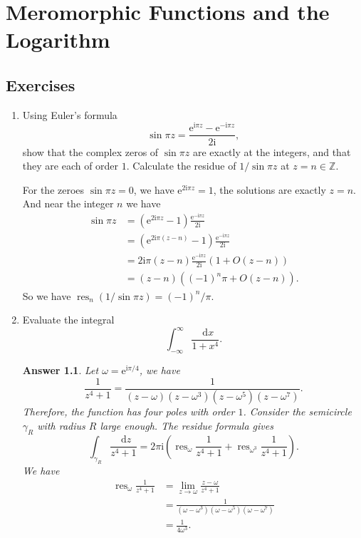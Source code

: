 \documentclass[11pt]{report}
\theoremstyle{mythm}
\let\oldendproof\endproof
\renewenvironment{proof}[1][\proofname]{%
  \oldproof[\normalfont \bfseries #1]%
}{\oldendproof}
\renewcommand*{\proofname}{Proof}
\theoremstyle{myans}
\newtheorem*{answer}{Answer}
\newcommand{\mi}{\mathrm{i}}
\newcommand{\me}{\mathrm{e}}
\newcommand{\dd}{\mathop{}\!\mathrm{d}}
\DeclareMathOperator{\res}{res}
\begin{document}
\setcounter{chapter}{2}
\chapter{Meromorphic Functions and the Logarithm}

\section{Exercises}

\begin{enumerate}
  \item Using Euler's formula
  \[ \sin \pi z = \frac{\me^{\mi \pi z} - \me^{-\mi \pi z}}{2\mi}, \]
  show that the complex zeros of $\sin\pi z$ are exactly at the integers, and that they are each of order $1$.
  Calculate the residue of $1/ \sin \pi z$ at $z = n \in \mathbb Z$.
  \begin{proof}
    For the zeroes $\sin \pi z = 0$, we have $\me^{2\mi \pi z} = 1$, the solutions are exactly
    $z=n$. And near the integer $n$ we have
    \begin{align*}
      \sin \pi z &= (\me^{2\mi \pi z} - 1)\frac{\me^{-\mi \pi z}}{2\mi}\\
      &= (\me^{2\mi \pi (z-n)} - 1)\frac{\me^{-\mi \pi z}}{2\mi}\\
      &= 2\mi \pi (z-n)\frac{\me^{-\mi \pi z}}{2\mi}(1 + O(z-n))\\
      &= (z-n)\left((-1)^n\pi  + O(z-n)\right).
    \end{align*}
    So we have $\res_n (1/\sin \pi z) = (-1)^n / \pi$.
  \end{proof}
  \item Evaluate the integral
  \[ \int_{-\infty}^{\infty} \frac{\dd x}{1+x^4}. \]
  \begin{answer}
    Let $\omega = \me^{\mi \pi/4}$, we have
    \[ \frac 1{z^4+1} =\frac 1{(z-\omega)(z-\omega^3)(z-\omega^5)(z-\omega^7)}. \]
    Therefore, the function has four poles with order $1$.
    Consider the semicircle $\gamma_R$ with radius $R$ large enough.
    The residue formula gives
    \[ \int_{\gamma_R} \frac{\dd z}{z^4+1} = 2\pi \mi \left(\res_{\omega} \frac 1{z^4+1}
    + \res_{\omega^3} \frac 1{z^4+1} \right). \]
    We have
    \begin{align*}
      \res_\omega \frac 1{z^4+1} &= \lim_{z\to \omega} \frac{z-\omega}{z^4+1}\\
      &= \frac1{(\omega-\omega^3)(\omega-\omega^5)(\omega-\omega^7)}\\
      &= \frac1{4\omega^3}.

\end{align*}
\end{answer}
\end{enumerate}
\end{document}

